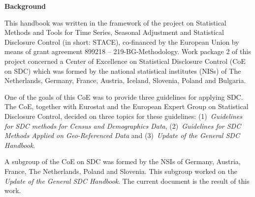 	
	\vfill %
	
	\newpage 

	

		
	\noindent \textbf{\large Background}\bigskip

	\justifying

	\noindent This handbook was written in the framework of the project on Statistical Methods and Tools
	 for Time Series, Seasonal Adjustment and Statistical Disclosure Control (in short: STACE), 
	 co-financed by the European Union by means of grant agreement 899218 -- 219-BG-Methodology. 
	 Work package 2 of this project concerned a Center of Excellence on Statistical Disclosure Control (CoE on SDC)
	  which was formed by the national statistical institutes (NISs) of The Netherlands, Germany, France, Austria, 
	  Iceland, Slovenia, Poland and Bulgaria.

	One of the goals of this CoE was to provide three guidelines for applying SDC. 
	The CoE, together with Eurostat and the European Expert Group on Statistical Disclosure Control, 
	decided on three topics for these guidelines: (1)~\textit{Guidelines for SDC methods for Census and Demographics Data},
	 (2)~\textit{Guidelines for SDC Methods Applied on Geo-Referenced Data} and (3)~\textit{Update of the General SDC Handbook}.

	A subgroup of the CoE on SDC was formed by the NSIs of Germany, Austria, France, The Netherlands, Poland and Slovenia. 
	This subgroup worked on the \textit{Update of the General SDC Handbook}. The current document is the result of this work.

	\vfill
